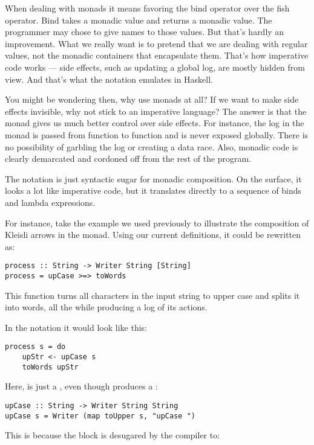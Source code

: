 When dealing with monads it means favoring the bind operator over the
fish operator. Bind takes a monadic value and returns a monadic value.
The programmer may chose to give names to those values. But that's
hardly an improvement. What we really want is to pretend that we are
dealing with regular values, not the monadic containers that encapsulate
them. That's how imperative code works --- side effects, such as
updating a global log, are mostly hidden from view. And that's what the
 notation emulates in Haskell.

You might be wondering then, why use monads at all? If we want to make
side effects invisible, why not stick to an imperative language? The
answer is that the monad gives us much better control over side effects.
For instance, the log in the  monad is passed from
function to function and is never exposed globally. There is no
possibility of garbling the log or creating a data race. Also, monadic
code is clearly demarcated and cordoned off from the rest of the
program.

The  notation is just syntactic sugar for monadic
composition. On the surface, it looks a lot like imperative code, but it
translates directly to a sequence of binds and lambda expressions.

For instance, take the example we used previously to illustrate the
composition of Kleisli arrows in the  monad. Using our
current definitions, it could be rewritten as:

\begin{Verbatim}
process :: String -> Writer String [String]
process = upCase >=> toWords
\end{Verbatim}
This function turns all characters in the input string to upper case and
splits it into words, all the while producing a log of its actions.

In the  notation it would look like this:

\begin{Verbatim}
process s = do 
    upStr <- upCase s
    toWords upStr
\end{Verbatim}
Here,  is just a , even though
 produces a :

\begin{Verbatim}
upCase :: String -> Writer String String
upCase s = Writer (map toUpper s, "upCase ")
\end{Verbatim}
This is because the  block is desugared by the compiler to:

